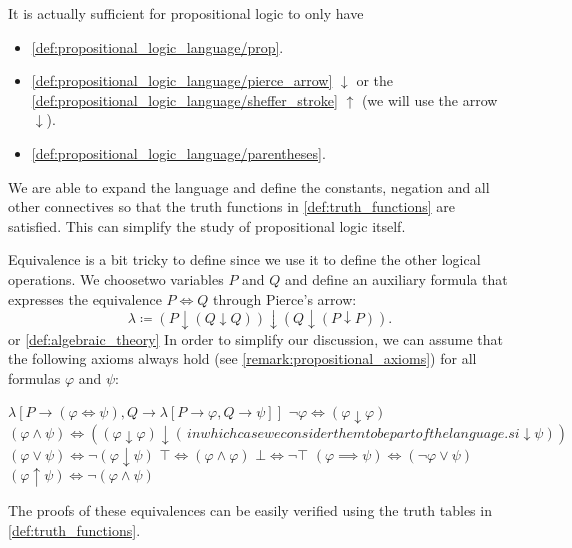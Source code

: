 \begin{remark}\label{remark:minimal_propositional_language}
  It is actually sufficient for propositional logic to only have
  \begin{itemize}
    \item \ref{def:propositional_logic_language/prop}.
    \item \ref{def:propositional_logic_language/pierce_arrow} \( \downarrow \) or the \ref{def:propositional_logic_language/sheffer_stroke} \( \uparrow \) (we will use the arrow \( \downarrow \)).
    \item \ref{def:propositional_logic_language/parentheses}.
  \end{itemize}

  We are able to expand the language and define the constants, negation and all other connectives so that the truth functions in \cref{def:truth_functions} are satisfied. This can simplify the study of propositional logic itself.

  Equivalence is a bit tricky to define since we use it to define the other logical operations. We choose\AOC two variables \( P \) and \( Q \) and define an auxiliary formula that expresses the equivalence \( P \iff Q \) through Pierce's arrow:
  \begin{equation*}
    \lambda \coloneqq (P \downarrow (Q \downarrow Q)) \downarrow (Q \downarrow (P \downarrow P)).
  \end{equation*}
 or \cref{def:algebraic_theory}
  In order to simplify our discussion, we can assume that the following axioms always hold (see \cref{remark:propositional_axioms}) for all formulas \( \varphi \) and \( \psi \):
  \begin{description}
     \( \lambda[P \to (\varphi \iff \psi), Q \to \lambda[P \to \varphi, Q \to \psi]] \)
     \( \neg \varphi \iff (\varphi \downarrow \varphi) \)
     \( (\varphi \land \psi) \iff ((\varphi \downarrow \varphi) \downarrow (\, in which case we consider them to be part of the language.si \downarrow \psi)) \)
     \( (\varphi \lor \psi) \iff \neg (\varphi \downarrow \psi) \)
     \( \top \iff (\varphi \land \varphi) \)
     \( \bot \iff \neg \top \)
     \( (\varphi \implies \psi) \iff (\neg \varphi \lor \psi) \)
     \( (\varphi \uparrow \psi) \iff \neg (\varphi \land \psi) \)
  \end{description}

  The proofs of these equivalences can be easily verified using the truth tables in \cref{def:truth_functions}.
\end{remark}

